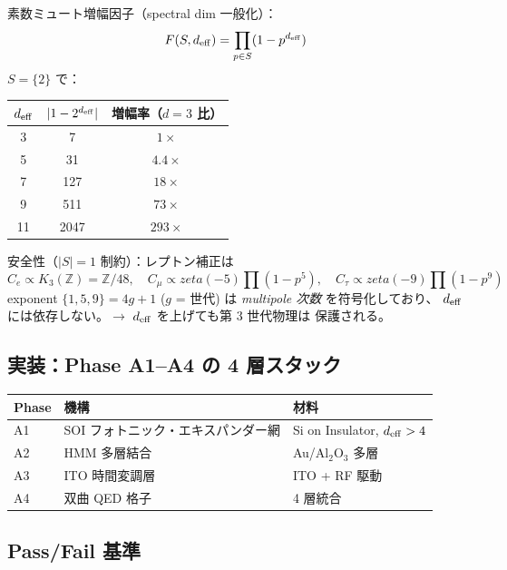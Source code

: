 \documentclass[11pt,a4paper]{article}
\def\zeta{zeta}%
\def\textbf#1{#1}%
\begin{document}
\begin{theorybox}
\textbf{素数ミュート増幅因子（spectral dim 一般化）}：
\[
  F(S, d_{\rm eff}) = \prod_{p \in S}(1 - p^{d_{\rm eff}})
\]
$S=\{2\}$ で：
\begin{center}
\begin{tabular}{ccc}
\toprule
$d_{\rm eff}$ & $|1 - 2^{d_{\rm eff}}|$ & 増幅率（$d=3$ 比） \\
\midrule
3  & 7      & $1\times$ \\
5  & 31     & $4.4\times$ \\
7  & 127    & $18\times$ \\
9  & 511    & $73\times$ \\
11 & 2047   & $293\times$ \\
\bottomrule
\end{tabular}
\end{center}

\textbf{安全性（$|S| = 1$ 制約）}：レプトン補正は
\[
  C_e   \propto K_3(\mathbb{Z}) = \mathbb{Z}/48,\quad
  C_\mu \propto \zeta(-5) \prod(1 - p^5),\quad
  C_\tau \propto \zeta(-9) \prod(1 - p^9)
\]
exponent $\{1, 5, 9\} = 4g+1$ ($g$ = 世代) は \emph{multipole 次数} を符号化しており、
\textbf{$d_{\rm eff}$ には依存しない}。$\to$ $d_{\rm eff}$ を上げても第 3 世代物理は
保護される。
\end{theorybox}

\subsection{実装：Phase A1--A4 の 4 層スタック}

\begin{center}
\begin{tabular}{lll}
\toprule
Phase & 機構 & 材料 \\
\midrule
A1 & SOI フォトニック・エキスパンダー網 & Si on Insulator, $d_{\rm eff} > 4$ \\
A2 & HMM 多層結合 & Au/Al$_2$O$_3$ 多層 \\
A3 & ITO 時間変調層 & ITO + RF 駆動 \\
A4 & 双曲 QED 格子 & 4 層統合 \\
\bottomrule
\end{tabular}
\end{center}

\subsection{Pass/Fail 基準}
\end{document}
